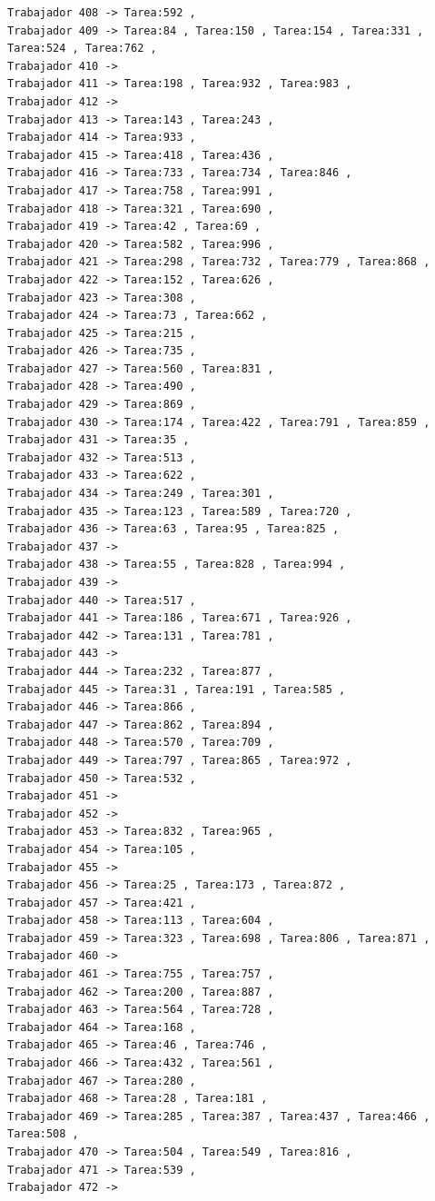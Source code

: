 \documentclass{article}
\begin{document}
\begin{lstlisting}
Trabajador 408 -> Tarea:592 , 
Trabajador 409 -> Tarea:84 , Tarea:150 , Tarea:154 , Tarea:331 , Tarea:524 , Tarea:762 , 
Trabajador 410 -> 
Trabajador 411 -> Tarea:198 , Tarea:932 , Tarea:983 , 
Trabajador 412 -> 
Trabajador 413 -> Tarea:143 , Tarea:243 , 
Trabajador 414 -> Tarea:933 , 
Trabajador 415 -> Tarea:418 , Tarea:436 , 
Trabajador 416 -> Tarea:733 , Tarea:734 , Tarea:846 , 
Trabajador 417 -> Tarea:758 , Tarea:991 , 
Trabajador 418 -> Tarea:321 , Tarea:690 , 
Trabajador 419 -> Tarea:42 , Tarea:69 , 
Trabajador 420 -> Tarea:582 , Tarea:996 , 
Trabajador 421 -> Tarea:298 , Tarea:732 , Tarea:779 , Tarea:868 , 
Trabajador 422 -> Tarea:152 , Tarea:626 , 
Trabajador 423 -> Tarea:308 , 
Trabajador 424 -> Tarea:73 , Tarea:662 , 
Trabajador 425 -> Tarea:215 , 
Trabajador 426 -> Tarea:735 , 
Trabajador 427 -> Tarea:560 , Tarea:831 , 
Trabajador 428 -> Tarea:490 , 
Trabajador 429 -> Tarea:869 , 
Trabajador 430 -> Tarea:174 , Tarea:422 , Tarea:791 , Tarea:859 , 
Trabajador 431 -> Tarea:35 , 
Trabajador 432 -> Tarea:513 , 
Trabajador 433 -> Tarea:622 , 
Trabajador 434 -> Tarea:249 , Tarea:301 , 
Trabajador 435 -> Tarea:123 , Tarea:589 , Tarea:720 , 
Trabajador 436 -> Tarea:63 , Tarea:95 , Tarea:825 , 
Trabajador 437 -> 
Trabajador 438 -> Tarea:55 , Tarea:828 , Tarea:994 , 
Trabajador 439 -> 
Trabajador 440 -> Tarea:517 , 
Trabajador 441 -> Tarea:186 , Tarea:671 , Tarea:926 , 
Trabajador 442 -> Tarea:131 , Tarea:781 , 
Trabajador 443 -> 
Trabajador 444 -> Tarea:232 , Tarea:877 , 
Trabajador 445 -> Tarea:31 , Tarea:191 , Tarea:585 , 
Trabajador 446 -> Tarea:866 , 
Trabajador 447 -> Tarea:862 , Tarea:894 , 
Trabajador 448 -> Tarea:570 , Tarea:709 , 
Trabajador 449 -> Tarea:797 , Tarea:865 , Tarea:972 , 
Trabajador 450 -> Tarea:532 , 
Trabajador 451 -> 
Trabajador 452 -> 
Trabajador 453 -> Tarea:832 , Tarea:965 , 
Trabajador 454 -> Tarea:105 , 
Trabajador 455 -> 
Trabajador 456 -> Tarea:25 , Tarea:173 , Tarea:872 , 
Trabajador 457 -> Tarea:421 , 
Trabajador 458 -> Tarea:113 , Tarea:604 , 
Trabajador 459 -> Tarea:323 , Tarea:698 , Tarea:806 , Tarea:871 , 
Trabajador 460 -> 
Trabajador 461 -> Tarea:755 , Tarea:757 , 
Trabajador 462 -> Tarea:200 , Tarea:887 , 
Trabajador 463 -> Tarea:564 , Tarea:728 , 
Trabajador 464 -> Tarea:168 , 
Trabajador 465 -> Tarea:46 , Tarea:746 , 
Trabajador 466 -> Tarea:432 , Tarea:561 , 
Trabajador 467 -> Tarea:280 , 
Trabajador 468 -> Tarea:28 , Tarea:181 , 
Trabajador 469 -> Tarea:285 , Tarea:387 , Tarea:437 , Tarea:466 , Tarea:508 , 
Trabajador 470 -> Tarea:504 , Tarea:549 , Tarea:816 , 
Trabajador 471 -> Tarea:539 , 
Trabajador 472 -> 

\end{lstlisting}
\end{document}
